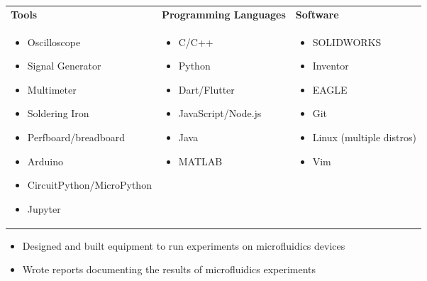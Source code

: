 \documentclass{resume}
\author{Jasper Chan}
\begin{document}
\maketitle

\TechnicalSkills
\begin{table}[H]
	\centering
	\begin{tabularx}{\textwidth}{X X X}
		\textbf{Tools} & \textbf{Programming Languages} & \textbf{Software} \\
		\begin{itemize}
			\item Oscilloscope
			\item Signal Generator
			\item Multimeter
			\item Soldering Iron
			\item Perfboard/breadboard
            \item Arduino
            \item CircuitPython/MicroPython
            \item Jupyter
		\end{itemize} &
		\begin{itemize}
			\item C/C++
			\item Python
            \item Dart/Flutter
			\item JavaScript/Node.js
			\item Java
			\item MATLAB
		\end{itemize} &
		\begin{itemize}
			\item SOLIDWORKS
			\item Inventor
			\item EAGLE
			\item Git
			\item Linux (multiple distros)
			\item Vim
		\end{itemize}
	\end{tabularx}
\end{table}
\vspace{-4em} %
\CoopStatus


\CoopWorkExperience

\begin{itemize}
    \item Designed and built equipment to run experiments on microfluidics devices
    \item Wrote reports documenting the results of microfluidics experiments
\end{itemize}
\end{document}
